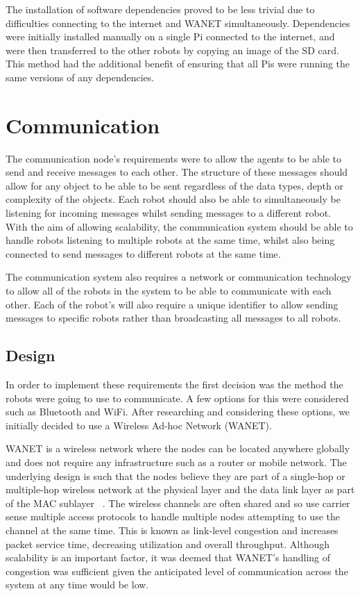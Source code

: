 The installation of software dependencies proved to be less trivial due to 
difficulties connecting to the internet and WANET simultaneously. 
Dependencies were initially installed manually on a single Pi connected to 
the internet, and were then transferred to the other robots by copying an 
image of the SD card. This method had the additional benefit of ensuring 
that all Pis were running the same versions of any dependencies.

\section{Communication}\label{soft/comms}
The communication node's requirements were to allow the agents to 
be able to send and receive messages to each other. The structure 
of these messages should allow for any object to be able to be sent 
regardless of the data types, depth or complexity of the objects. 
Each robot should also be able to simultaneously be listening for 
incoming messages whilst sending messages to a different robot. 
With the aim of allowing scalability, the communication system 
should be able to handle robots listening to multiple robots at the 
same time, whilst also being connected to send messages to different 
robots at the same time. 

The communication system also requires a network or communication 
technology to allow all of the robots in the system to be able to 
communicate with each other. Each of the robot's will also require 
a unique identifier to allow sending messages to specific robots 
rather than broadcasting all messages to all robots. 

\subsection{Design}\label{soft/comms/design}
In order to implement these requirements the first decision was the 
method the robots were going to use to communicate. A few options 
for this were considered such as Bluetooth and WiFi. After 
researching  and considering these options, we initially decided to 
use a Wireless Ad-hoc Network (WANET). 

WANET is a wireless network where the nodes can be located anywhere 
globally and does not require any infrastructure such as a router or 
mobile network. The underlying design is such that the nodes believe 
they are part of a single-hop or multiple-hop wireless network at the 
physical layer and the data link layer as part of the MAC sublayer~
\cite{rajesh2015congestion}. The wireless channels are often shared 
and so use carrier sense multiple access protocols to handle multiple 
nodes attempting to use the channel at the same time. This is known 
as link-level congestion and increases packet service time, 
decreasing utilization and overall throughput. Although scalability 
is an important  factor, it was deemed that WANET's handling of 
congestion was sufficient given the anticipated level of 
communication across the system at any time would be low. 

